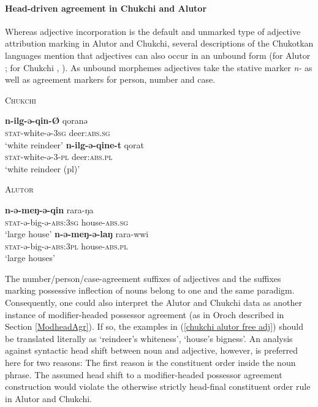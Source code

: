 \paragraph{Head-driven agreement in Chukchi and Alutor}
Whereas adjective incorporation is the default and unmarked type of adjective attribution marking in Alutor and Chukchi, several descriptions of the Chukotkan languages mention that adjectives can also occur in an unbound form (for Alutor \citealt{nagayama2003}; for Chukchi \citealt[103–104, 421–429]{skorik1960}, \citealt[251]{comrie1981}). As unbound morphemes adjectives take the stative marker \textit{n-} as well as agreement markers for person, number and case.
\begin{exe}
\ex \label{chukchi alutor free adj}
\begin{xlist}
\ex \textsc{Chukchi} \citep{skorik1960}
\begin{xlist}
\ex
\gll	\textbf{n-ilg-ə-qin-Ø} qoranə\\
	\textsc{stat}-white-ə-\textsc{3sg} deer:\textsc{abs.sg}\\
\glt	‘white reindeer’
\ex
\gll	\textbf{n-ilg-ə-qine-t} qorat\\
	\textsc{stat}-white-ə-3-\textsc{pl} deer:\textsc{abs.pl}\\
\glt	‘white reindeer (pl)’
\end{xlist}
\ex \textsc{Alutor} \citep{nagayama2003}
\begin{xlist}
\ex
\gll	\textbf{n-ə-meŋ-ə-qin} rara-ŋa\\
	\textsc{stat}-ə-big-ə-\textsc{abs:3sg} house-\textsc{abs.sg}\\
\glt	‘large house’
\ex
\gll	\textbf{n-ə-meŋ-ə-laŋ} rara-wwi\\
	\textsc{stat}-ə-big-ə-\textsc{abs:3pl} house-\textsc{abs.pl}\\
\glt	‘large houses’
\end{xlist}
\end{xlist}
\end{exe}
The number/person/case-agreement suffixes of adjectives and the suffixes mar\-king possessive inflection of nouns belong to one and the same para\-digm. Consequently, one could also interpret the Alutor and Chukchi data as another instance of modifier-headed possessor agreement (as in Oroch described in Section \ref{ModheadAgr}). If so, the examples in (\ref{chukchi alutor free adj}) should be translated literally as ‘reindeer's whiteness’, ‘house's bigness’. An analysis against syntactic head shift between noun and adjective, however, is preferred here for two reasons: The first reason is the constituent order inside the noun phrase. The assumed head shift to a modifier-headed possessor agreement construction would violate the otherwise strictly head-final constituent order rule in Alutor and Chukchi. 

